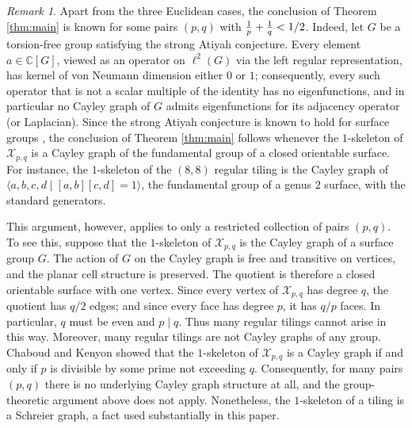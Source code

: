 \documentclass[11pt]{article}
\theoremstyle{remark}
\newtheorem{remark}[theorem]{Remark}
\newcommand{\cX}{\mathcal X}
\begin{document}
\begin{remark} Apart from the three Euclidean cases, the conclusion of Theorem \ref{thm:main} is known for some pairs $(p,q)$ with ${1\over p}+{1\over q} < 1/2$. Indeed, let $G$ be a torsion-free group satisfying the strong Atiyah conjecture. Every element $a\in\mathbb C[G]$, viewed as an operator on $\ell^2(G)$ via the left regular representation, has kernel of von Neumann dimension either $0$ or $1$; consequently, every such operator that is not a scalar multiple of the identity has no eigenfunctions, and in particular no Cayley graph of $G$ admits eigenfunctions for its adjacency operator (or Laplacian). Since the strong Atiyah conjecture is known to hold for surface groups \cite{SurfaceAtiyah20}, the conclusion of Theorem \ref{thm:main} follows whenever the $1$-skeleton of $\cX_{p,q}$ is a Cayley graph of the fundamental group of a closed orientable surface. For instance, the $1$-skeleton of the $(8,8)$ regular tiling is the Cayley graph of $\langle a,b,c,d \mid [a,b][c,d]=1 \rangle$, the fundamental group of a genus $2$ surface, with the standard generators. 

This argument, however, applies to only a restricted collection of pairs $(p,q)$. To see this, suppose that the $1$-skeleton of $\cX_{p,q}$ is the Cayley graph of a surface group $G$. The action of $G$ on the Cayley graph is free and transitive on vertices, and the planar cell structure is preserved. The quotient is therefore a closed orientable surface with one vertex. Since every vertex of $\cX_{p,q}$ has degree $q$, the quotient has $q/2$ edges; and since every face has degree $p$, it has $q/p$ faces. In particular, $q$ must be even and $p \mid q$. 
Thus many regular tilings cannot arise in this way. Moreover, many regular tilings are not Cayley graphs of any group. Chaboud and Kenyon \cite{ChaboudKenyon96} showed that the $1$-skeleton of $\cX_{p,q}$ is a Cayley graph if and only if $p$ is divisible by some prime not exceeding $q$. Consequently, for many pairs $(p,q)$ there is no underlying Cayley graph structure at all, and the group-theoretic argument above does not apply. Nonetheless, the $1$-skeleton of a tiling is a Schreier graph, a fact used substantially in this paper.
\end{remark}
\end{document}
